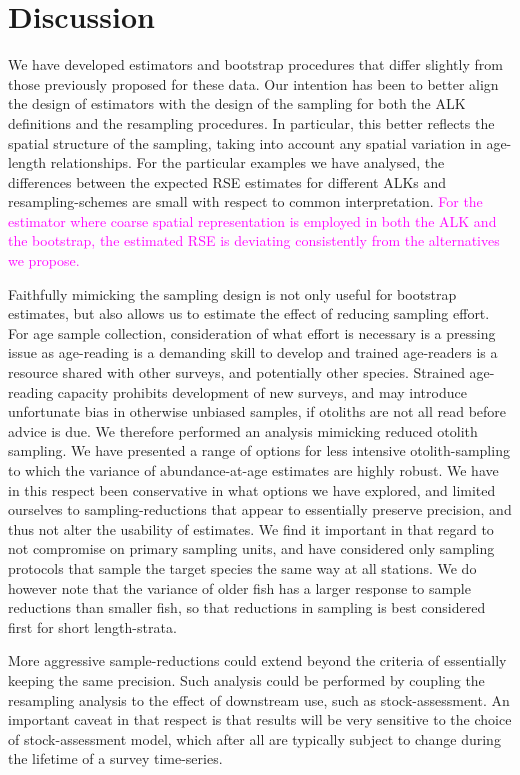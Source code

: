 \documentclass[a4paper 12pt]{article}
\numberwithin{equation}{section}
\newcommand{\natty}[1]{\textcolor{magenta}{#1}}
\begin{document}
\clearpage
\section{Discussion}
\label{sec:discussion}


We have developed estimators and bootstrap procedures that differ slightly from those previously proposed for these data. 
Our intention has been to better align the design of estimators with the design of the sampling for both the ALK definitions and the resampling procedures. In particular, this better reflects the spatial structure of the sampling, taking into account any spatial variation in age-length relationships. For the particular examples we have analysed, the 
differences between the expected RSE estimates for different ALKs and resampling-schemes are small with respect to common interpretation. \natty{For the estimator where coarse spatial representation is employed in both the ALK and the bootstrap, the estimated RSE is deviating consistently from the alternatives we propose.}

Faithfully mimicking the sampling design is not only useful for bootstrap estimates, but also allows us to estimate the effect of reducing sampling effort. For age sample collection,  consideration of what effort is necessary is a pressing issue as age-reading is a demanding skill to develop and trained  age-readers is a resource shared with other surveys, and potentially other species. Strained age-reading capacity prohibits development of new surveys, and may introduce unfortunate bias in otherwise unbiased samples, if otoliths are not all read before advice is due. We therefore performed an analysis mimicking reduced otolith sampling. We have presented a range of options for less intensive otolith-sampling to which the variance of abundance-at-age estimates are highly robust. We have in this respect been conservative in what options we have explored, and limited ourselves to sampling-reductions that appear to essentially preserve precision, and thus not alter the usability of estimates. We find it important in that regard to not compromise on primary sampling units, and have considered only sampling protocols that sample the target  species the same way at all stations. We do however note that the variance of older fish has a larger response to sample reductions than smaller fish, so that reductions in sampling is best considered first for short length-strata.
 
More aggressive sample-reductions could extend beyond the criteria of essentially keeping the same precision. 
Such analysis could be performed by coupling the resampling analysis to the effect of downstream use, such as stock-assessment. 
An important caveat in that respect is that results will be very sensitive to the choice of stock-assessment model, which 
after all are typically subject to change during the lifetime of a survey time-series.
\end{document}
